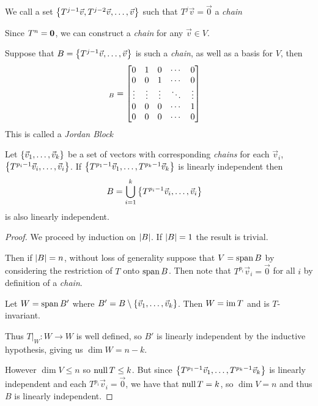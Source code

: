 \begin{definition}[Chain]
  We call a set $\left\{T^{j-1}\vec v, T^{j-2}\vec v, \ldots, \vec v\right\}$ such that $T^j\vec v = \vec 0$ a \emph{chain}
\end{definition}
\begin{remark}
  Since $T^n = {\bf 0}$, we can construct a \emph{chain} for any $\vec v \in V$.
\end{remark}
\begin{remark}
  Suppose that $B = \left\{T^{j-1}\vec v, \ldots, \vec v\right\}$ is such a \emph{chain}, as well as a basis for $V$, then
  \begin{align}
    [T]_B &= \bmatr{
      0 & 1 & 0 & \cdots & 0 \\
      0 & 0 & 1 & \cdots & 0 \\
      \vdots & \vdots & \vdots & \ddots & \vdots \\
      0 & 0 & 0 & \cdots & 1 \\
      0 & 0 & 0 & \cdots & 0
    }
  \end{align}
  This is called a \emph{Jordan Block}
\end{remark}

\begin{theorem}
  Let $\left\{\vec v_1,\ldots,\vec v_k\right\}$ be a set of vectors with corresponding \emph{chains} for each $\vec v_i$,
  $\left\{T^{p_i-1}\vec v_i,\ldots,\vec v_i\right\}$. If $\left\{T^{p_1-1}\vec v_1,\ldots,T^{p_k-1}\vec v_k\right\}$
  is linearly independent then
  \begin{align}
    B &= \bigcup_{i=1}^k\left\{T^{p_i-1}\vec v_i,\ldots,\vec v_i\right\}
  \end{align}
  is also linearly independent.
\end{theorem}
\begin{proof}
  We proceed by induction on $\left|B\right|$. If $\left|B\right| = 1$ the result is trivial.

  Then if $\left|B\right| = n$, without loss of generality suppose that $V = \operatorname{span} B$ by considering the restriction of $T$ onto $\operatorname{span} B$.
  Then note that $T^{p_i}\vec v_i = \vec 0$ for all $i$ by definition of a \emph{chain}.

  Let $W = \operatorname{span} B'$ where $B' = B \setminus \left\{\vec v_1,\ldots,\vec v_k\right\}$. Then $W = \operatorname{im} T$ and is $T$-invariant.

  Thus $T\big\rvert_{W} : W \to W$ is well defined, so $B'$ is linearly independent by the inductive hypothesis, giving us $\dim W = n - k$.

  However $\dim V \le n$ so $\operatorname{null} T \le k$. But since $\left\{T^{p_1-1}\vec v_1,\ldots,T^{p_k-1}\vec v_k\right\}$ is linearly independent and each $T^{p_i}\vec v_i = \vec 0$,
  we have that $\operatorname{null} T = k$, so $\dim V = n$ and thus $B$ is linearly independent.
\end{proof}

